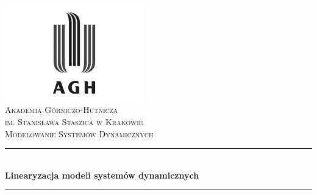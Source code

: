 \begin{titlepage}

\newcommand{\HRule}{\rule{\linewidth}{0.5mm}}

\center
 

\includegraphics[width=6cm]{../res/img/logo.png}\\[1cm]
 
 

\textsc{\LARGE Akademia Górniczo-Hutnicza \\[0.2cm]
im. Stanisława Staszica w Krakowie}\\[1.5cm]

\textsc{\Large Modelowanie Systemów Dynamicznych}\\[0.5cm]


\HRule \\[0.4cm]
{ \huge \bfseries Linearyzacja modeli systemów dynamicznych}\\%
\HRule \\[1.5cm] 
  


\end{titlepage}
